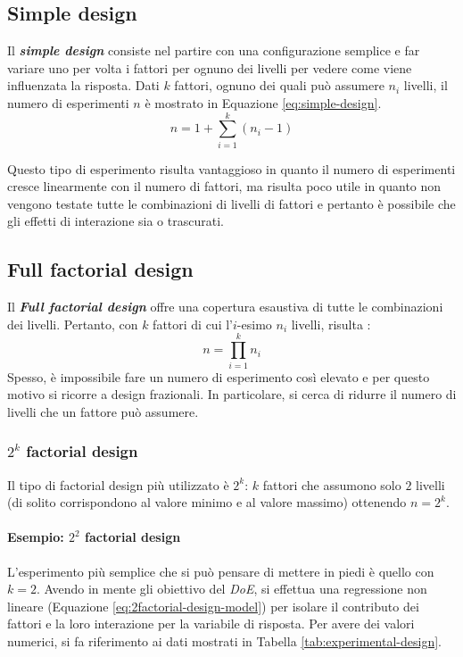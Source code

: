 \documentclass{article}
\begin{document}
\subsection{Simple design}
Il \textbf{\textit{simple design}} consiste nel partire con una configurazione semplice e 
far variare uno per volta i fattori per ognuno dei livelli per vedere come viene influenzata
la risposta. Dati $k$ fattori, ognuno dei quali può assumere $n_i$ livelli, il numero di 
esperimenti $n$ è mostrato in Equazione \ref{eq:simple-design}.
\begin{equation}
  n = 1 + \displaystyle\sum_{i=1}^{k}(n_i - 1)
  \label{eq:simple-design}
\end{equation}

Questo tipo di esperimento risulta vantaggioso in quanto il numero di esperimenti cresce 
linearmente con il numero di fattori, ma risulta poco utile in quanto non vengono testate 
tutte le combinazioni di livelli di fattori e pertanto è possibile che gli effetti di 
interazione sia o trascurati.


\subsection{Full factorial design}
Il \textbf{\textit{Full factorial design}} offre una copertura esaustiva di tutte le 
combinazioni dei livelli. Pertanto, con $k$ fattori di cui l'$i$-esimo $n_i$ livelli, risulta
:
\[
  n = \prod_{i=1}^kn_i
\]
Spesso, è impossibile fare un numero di esperimento così elevato e per questo motivo si 
ricorre a design frazionali. In particolare, si cerca di ridurre il numero di livelli che un
fattore può assumere.

\subsubsection{$2^k$ factorial design}
Il tipo di factorial design più utilizzato è $2^k$: $k$ fattori che assumono solo $2$ livelli
(di solito corrispondono al valore minimo e al valore massimo) ottenendo $n = 2^k$.

\paragraph{Esempio: $2^2$ factorial design}
L'esperimento più semplice che si può pensare di mettere in piedi è quello con $k = 2$. 
Avendo in mente gli obiettivo del \textit{DoE}, si effettua una regressione non lineare
(Equazione \ref{eq:2factorial-design-model}) per isolare il contributo dei fattori e la loro
interazione per la variabile di risposta. Per avere dei valori numerici, si fa riferimento 
ai dati mostrati in Tabella \ref{tab:experimental-design}.
\end{document}
